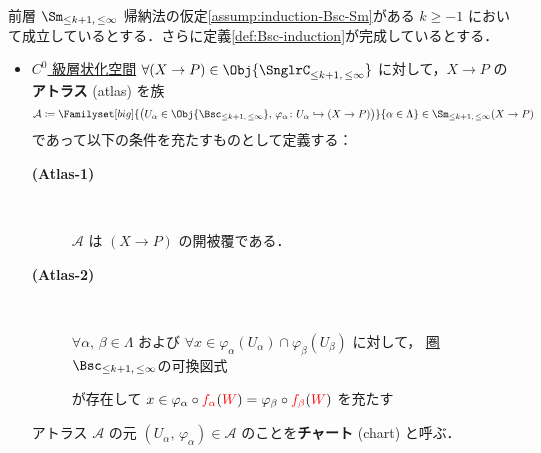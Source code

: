 \documentclass[TQFT_main]{subfiles}
\begin{document}
\begin{mydef}[label=def:Sm-induction,breakable]{前層 $\Sm_{\le k+1,\, \le \infty}$}
    帰納法の仮定\ref{assump:induction-Bsc-Sm}がある $k \ge -1$ において成立しているとする．さらに定義\ref{def:Bsc-induction}が完成しているとする．
    \begin{itemize}
        \item \hyperref[def:Snglr-C0]{$C^0$ 級層状化空間} $\forall (X \to P) \in \Obj{\SnglrC_{\le k+1,\, \le \infty}}$ に対して，$X \to P$ の\textbf{アトラス} (atlas) を族
        \begin{align}
            \mathcal{A} \coloneqq \Familyset[big]{\bigl(U_\alpha \in \Obj{\Bsc_{\le k+1,\, \le \infty}},\, \varphi_\alpha \colon U_\alpha \hookrightarrow (X \to P)\bigr)}{\alpha \in \Lambda} \in \Sm_{\le k+1,\, \le \infty} (X \to P)
        \end{align}
        であって以下の条件を充たすものとして定義する：
        \begin{description}
            \item[\textbf{(Atlas-1)}]　
            
            $\mathcal{A}$ は $(X \to P)$ の開被覆である．
    
            \item[\textbf{(Atlas-2)}]　
            
            $\forall \alpha,\, \beta \in \Lambda$ および $\forall x \in \varphi_\alpha (U_\alpha) \cap \varphi_\beta (U_\beta)$ に対して，
            \hyperref[def:Bsc-induction]{圏 $\Bsc_{\le k+1,\, \le \infty}$}の可換図式
            \begin{center}
            \end{center}
            が存在して $x \in \varphi_\alpha \circ \textcolor{red}{f_\alpha} (\textcolor{red}{W}) = \varphi_\beta \circ \textcolor{red}{f_\beta} (\textcolor{red}{W})$ を充たす
        \end{description}
        アトラス $\mathcal{A}$ の元 $(U_\alpha,\, \varphi_\alpha) \in \mathcal{A}$ のことを\textbf{チャート} (chart) と呼ぶ．


\end{itemize}
\end{mydef}
\end{document}
